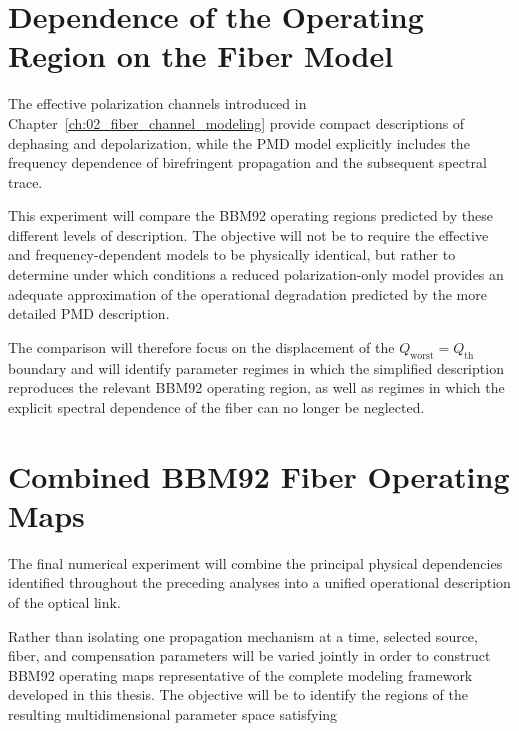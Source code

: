 \section{Dependence of the Operating Region on the Fiber Model}
\label{sec:operating_region_model_comparison}

The effective polarization channels introduced in
Chapter~\ref{ch:02_fiber_channel_modeling} provide compact descriptions of
dephasing and depolarization, while the PMD model explicitly includes the
frequency dependence of birefringent propagation and the subsequent spectral
trace.

This experiment will compare the BBM92 operating regions predicted by these
different levels of description. The objective will not be to require the
effective and frequency-dependent models to be physically identical, but rather
to determine under which conditions a reduced polarization-only model provides
an adequate approximation of the operational degradation predicted by the more
detailed PMD description.

The comparison will therefore focus on the displacement of the
\(Q_{\mathrm{worst}}=Q_{\mathrm{th}}\) boundary and will identify parameter
regimes in which the simplified description reproduces the relevant BBM92
operating region, as well as regimes in which the explicit spectral dependence
of the fiber can no longer be neglected.

% 



\section{Combined BBM92 Fiber Operating Maps}
\label{sec:combined_bbm92_fiber_operating_maps}

The final numerical experiment will combine the principal physical dependencies
identified throughout the preceding analyses into a unified operational
description of the optical link.

Rather than isolating one propagation mechanism at a time, selected source,
fiber, and compensation parameters will be varied jointly in order to construct
BBM92 operating maps representative of the complete modeling framework developed
in this thesis. The objective will be to identify the regions of the resulting
multidimensional parameter space satisfying

